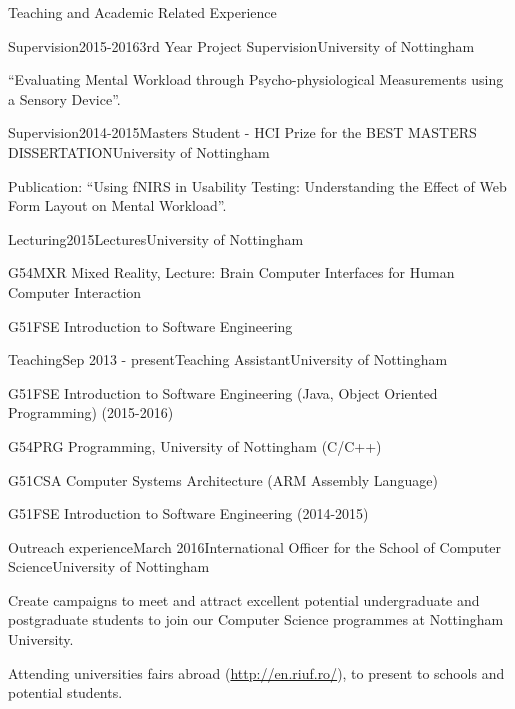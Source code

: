 \documentclass{resume} %
\begin{document}
\begin{rSection}{Teaching and Academic Related Experience}
    \begin{rSubsection}{Supervision}{2015-2016}{3rd Year Project Supervision}{University of Nottingham}
        \item  ``Evaluating Mental Workload through Psycho-physiological Measurements using a Sensory Device''.
    \end{rSubsection}
    \vspace{-1 mm}

    \begin{rSubsection}{Supervision}{2014-2015}{Masters Student - HCI Prize for the BEST MASTERS DISSERTATION}{University of Nottingham}
        \item  Publication: ``Using fNIRS in Usability Testing: Understanding the Effect of Web Form Layout on Mental Workload''.
    \end{rSubsection}
\vspace{-1 mm}
    \begin{rSubsection}{Lecturing}{2015}{Lectures}{University of Nottingham}
        \item G54MXR Mixed Reality, Lecture: Brain Computer Interfaces for Human Computer Interaction
        \item G51FSE Introduction to Software Engineering
    \end{rSubsection}
\vspace{-1 mm}
    \begin{rSubsection}{Teaching}{Sep 2013 - present}{Teaching Assistant}{University of Nottingham}
        \item G51FSE Introduction to Software Engineering (Java, Object Oriented Programming) (2015-2016)
        \item G54PRG Programming, University of Nottingham (C/C++)
        \item G51CSA Computer Systems Architecture (ARM Assembly Language)
        \item G51FSE Introduction to Software Engineering (2014-2015)
    \end{rSubsection}
    \begin{rSubsection}{Outreach experience}{March 2016}{International Officer for the School of Computer Science}{University of Nottingham}
        \item Create campaigns to meet and attract excellent potential undergraduate and postgraduate students to join our Computer Science programmes at Nottingham University.
        \item Attending universities fairs abroad (\url{http://en.riuf.ro/}), to present to schools and potential students.
    \end{rSubsection}
\end{rSection}
\vspace{-2 mm}
\end{document}
